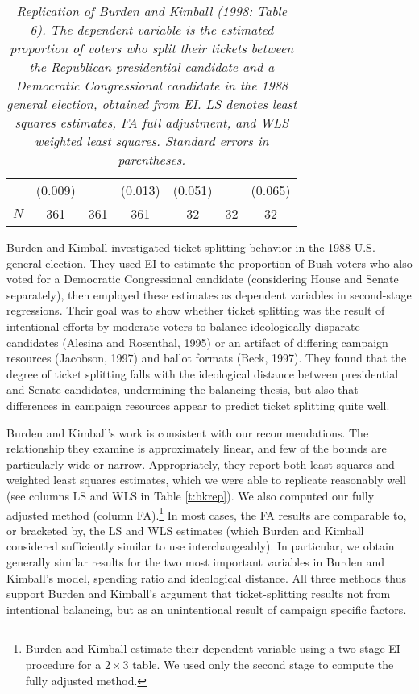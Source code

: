 \documentclass[11pt,titlepage]{article}
\begin{document}
\begin{table}[th]
\begin{center}
\begin{tabular}{lcccccc}
        &       (0.009) &               &       (0.013) &       (0.051) &               &       (0.065) \\
$N$     &       361     &       361     &       361     &       32      &       32      &       32      \\
\hline
\end{tabular}
\end{center}
\caption{\em Replication of Burden and Kimball (1998: Table 6).  
The dependent variable is the estimated proportion of 
voters who split their tickets between the Republican presidential 
candidate and a Democratic Congressional candidate in the 1988 general 
election, obtained from EI.  LS denotes least squares estimates, FA 
full adjustment, and WLS weighted least squares.  Standard errors in 
parentheses.}
\end{table}

Burden and Kimball investigated ticket-splitting behavior in the 1988
U.S. general election.  They used EI to estimate the proportion of
Bush voters who also voted for a Democratic Congressional candidate
(considering House and Senate separately), then employed these
estimates as dependent variables in second-stage regressions.  Their
goal was to show whether ticket splitting was the result of
intentional efforts by moderate voters to balance ideologically
disparate candidates (Alesina and Rosenthal, 1995) or an artifact of
differing campaign resources (Jacobson, 1997) and ballot formats
(Beck, 1997).  They found that the degree of ticket splitting falls
with the ideological distance between presidential and Senate
candidates, undermining the balancing thesis, but also that
differences in campaign resources appear to predict ticket splitting
quite well.

Burden and Kimball's work is consistent with our recommendations.  The
relationship they examine is approximately linear, and few of the
bounds are particularly wide or narrow.  Appropriately, they report
both least squares and weighted least squares estimates, which we were
able to replicate reasonably well (see columns LS and WLS in Table
\ref{t:bkrep}).  We also computed our fully adjusted method (column
FA).\footnote{Burden and Kimball estimate their dependent variable
  using a two-stage EI procedure for a $2\times 3$ table.  We used
  only the second stage to compute the fully adjusted method.} In most
cases, the FA results are comparable to, or bracketed by, the LS and
WLS estimates (which Burden and Kimball considered sufficiently
similar to use interchangeably).  In particular, we obtain generally
similar results for the two most important variables in Burden and
Kimball's model, spending ratio and ideological distance.  All three
methods thus support Burden and Kimball's argument that
ticket-splitting results not from intentional balancing, but as an
unintentional result of campaign specific factors.
\end{document}
